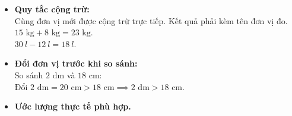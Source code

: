 \documentclass[11pt,a4paper]{article}
\begin{document}
\begin{minipage}[t]{0.49\textwidth}\vspace{0pt}
\begin{tcolorbox}[
  enhanced,
  colback=teal!4!white,
  colframe=teal!75!black,
  arc=2mm, boxrule=0.8pt,
  left=2mm, right=2mm, top=1.8mm, bottom=1.8mm,
  title={\footnotesize\bfseries\color{white}\faSliders\ 2. Kĩ năng tính toán và so sánh}
]
{\footnotesize
\begin{itemize}\setlength{\itemsep}{1pt}\setlength{\leftskip}{-2.5mm}
  \item \textbf{Quy tắc cộng trừ:}\\
  Cùng đơn vị mới được cộng trừ trực tiếp. Kết quả phải kèm tên đơn vị đo.\\
  $15\text{ kg} + 8\text{ kg} = 23\text{ kg}$.\\
  $30\ l - 12\ l = 18\ l$.
  \item \textbf{Đổi đơn vị trước khi so sánh:}\\
  So sánh $2\text{ dm}$ và $18\text{ cm}$:\\
  Đổi $2\text{ dm} = 20\text{ cm} > 18\text{ cm} \implies 2\text{ dm} > 18\text{ cm}$.
  \item \textbf{Ước lượng thực tế phù hợp.}
\end{itemize}
}
\end{tcolorbox}
\end{minipage}
\end{document}
